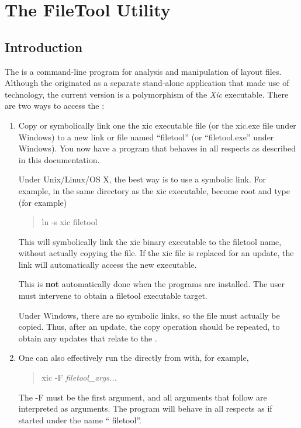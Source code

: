 
\chapter{The FileTool Utility}
\label{filetool}
\section{Introduction}

The {\FileTool} is a command-line program for analysis and
manipulation of layout files.  Although the {\FileTool} originated as
a separate stand-alone application that made use of {\Xic} technology,
the current version is a polymorphism of the {\it Xic} executable. 
There are two ways to access the {\FileTool}:

\begin{enumerate}
\item{Copy or symbolically link one the {\vt xic} executable file (or
the {\vt xic.exe} file under Windows) to a new link or file named
``{\vt filetool}'' (or ``{\vt filetool.exe}'' under Windows).  You now
have a {\FileTool} program that behaves in all respects as described
in this documentation.

Under Unix/Linux/OS X, the best way is to use a symbolic link.  For
example, in the same directory as the {\vt xic} executable, become
root and type (for example)
\begin{quote}
\vt ln -s xic filetool
\end{quote}
This will symbolically link the {\vt xic} binary executable to the
{\vt filetool} name, without actually copying the file.  If the {\vt
xic} file is replaced for an update, the link will automatically
access the new executable.

This is {\bf not} automatically done when the programs are installed. 
The user must intervene to obtain a {\vt filetool} executable target.

Under Windows, there are no symbolic links, so the file must actually
be copied.  Thus, after an update, the copy operation should be
repeated, to obtain any updates that relate to the {\FileTool}.}

\item{One can also effectively run the {\FileTool} directly from
{\Xic} with, for example,
\begin{quote}
{\vt xic -F} {\it filetool\_args...}
\end{quote}
The {\vt -F} must be the first argument, and all arguments that
follow are interpreted as {\FileTool} arguments.  The program will
behave in all respects as if started under the name ``{\vt
filetool}''.}
\end{enumerate}

